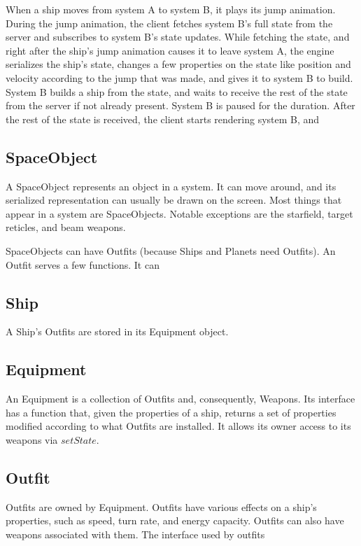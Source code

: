 \documentclass{article}
\begin{document}
When a ship moves from system A to system B, it plays its jump animation. During the jump animation, the client fetches system B's full state from the server and subscribes to system B's state updates. While fetching the state, and right after the ship's jump animation causes it to leave system A, the engine serializes the ship's state, changes a few properties on the state like position and velocity according to the jump that was made, and gives it to system B to build. System B builds a ship from the state, and waits to receive the rest of the state from the server if not already present. System B is paused for the duration. After the rest of the state is received, the client starts rendering system B, and 

\subsection{SpaceObject}
A SpaceObject represents an object in a system. It can move around, and its serialized representation can usually be drawn on the screen. Most things that appear in a system are SpaceObjects. Notable exceptions are the starfield, target reticles, and beam weapons.
 
SpaceObjects can have Outfits (because Ships and Planets need Outfits). An Outfit serves a few functions. It can 

\subsection{Ship}
A Ship's Outfits are stored in its Equipment object.

\subsection{Equipment}
An Equipment is a collection of Outfits and, consequently, Weapons. Its interface has a function that, given the properties of a ship, returns a set of properties modified according to what Outfits are installed. It allows its owner access to its weapons via $setState$.

\subsection{Outfit}
Outfits are owned by Equipment. Outfits have various effects on a ship's properties, such as speed, turn rate, and energy capacity. Outfits can also have weapons associated with them. The interface used by outfits
\end{document}
